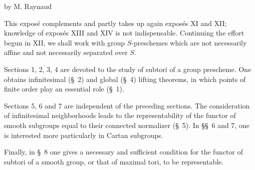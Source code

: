 \label{XV}
\begin{center}by M. Raynaud{\renewcommand{\thefootnote}{*}\footnotemark}\end{center}
{\renewcommand{\thefootnote}{*}}
{\renewcommand{\thefootnote}{0}}
\setcounter{footnote}{0}

This expos\'e complements and partly takes up again expos\'es XI and XII; knowledge of expos\'es XIII and XIV is not indispensable. Continuing the effort begun in XII, we shall work with group $S$-preschemes which are not necessarily affine and not necessarily separated over $S$.

Sections 1, 2, 3, 4 are devoted to the study of subtori of a group prescheme. One obtains infinitesimal (\S~2) and global (\S~4) lifting theorems, in which points of finite order play an essential role (\S~1).

Sections 5, 6 and 7 are independent of the preceding sections. The consideration of infinitesimal neighborhoods leads to the representability of the functor of smooth subgroups equal to their connected normalizer (\S~5). In \S\S~6 and 7, one is interested more particularly in Cartan subgroups.

Finally, in \S~8 one gives a necessary and sufficient condition for the functor of subtori of a smooth group, or that of maximal tori, to be representable.

